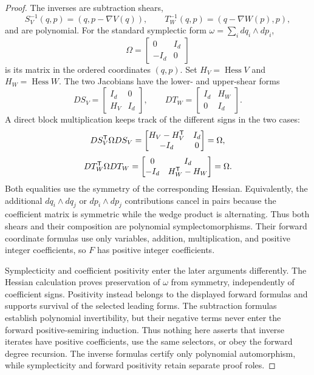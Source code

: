 \documentclass[11pt,letterpaper]{article}
\theoremstyle{plain}
\begin{document}
\begin{proof}
The inverses are subtraction shears,
\[
S_V^{-1}(q,p)=(q,p-\nabla V(q)),\qquad
T_W^{-1}(q,p)=(q-\nabla W(p),p),
\]
and are polynomial.  For the standard symplectic form $\omega=\sum_i dq_i\wedge dp_i$,
\[
\Omega=
\begin{bmatrix}
0&I_d\\
-I_d&0
\end{bmatrix}
\]
is its matrix in the ordered coordinates $(q,p)$.  Set $H_V=\operatorname{Hess}V$ and $H_W=\operatorname{Hess}W$.  The two Jacobians have the lower- and upper-shear forms
\[
DS_V=
\begin{bmatrix}
I_d&0\\
H_V&I_d
\end{bmatrix},
\qquad
DT_W=
\begin{bmatrix}
I_d&H_W\\
0&I_d
\end{bmatrix}.
\]
A direct block multiplication keeps track of the different signs in the two cases:
\[
DS_V^{\mathsf{T}}\Omega DS_V
=
\begin{bmatrix}
H_V-H_V^{\mathsf{T}}&I_d\\
-I_d&0
\end{bmatrix}
=\Omega,
\]
\[
DT_W^{\mathsf{T}}\Omega DT_W
=
\begin{bmatrix}
0&I_d\\
-I_d&H_W^{\mathsf{T}}-H_W
\end{bmatrix}
=\Omega.
\]
Both equalities use the symmetry of the corresponding Hessian.  Equivalently, the additional $dq_i\wedge dq_j$ or $dp_i\wedge dp_j$ contributions cancel in pairs because the coefficient matrix is symmetric while the wedge product is alternating.
Thus both shears and their composition are polynomial symplectomorphisms.  Their forward coordinate formulas use only variables, addition, multiplication, and positive integer coefficients, so $F$ has positive integer coefficients.

Symplecticity and coefficient positivity enter the later arguments differently.  The Hessian calculation proves preservation of $\omega$ from symmetry, independently of coefficient signs.  Positivity instead belongs to the displayed forward formulas and supports survival of the selected leading forms.  The subtraction formulas establish polynomial invertibility, but their negative terms never enter the forward positive-semiring induction.  Thus nothing here asserts that inverse iterates have positive coefficients, use the same selectors, or obey the forward degree recursion.  The inverse formulas certify only polynomial automorphism, while symplecticity and forward positivity retain separate proof roles.
\end{proof}
\end{document}
